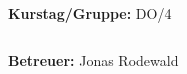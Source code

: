 \documentclass[12pt,a4paper]{article}
\begin{document}
\begin{verbatim}


\end{verbatim}
			\begin{flushleft}
			\textbf{\Large{Kurstag/Gruppe:}} \Large{DO/4}
			\end{flushleft}

\begin{verbatim}

\end{verbatim}
			\begin{flushleft}
			\LARGE{\textbf{Betreuer:}}	\Large{Jonas Rodewald}	
			\end{flushleft}

\pagebreak
\setlength{\columnsep}{20pt}
\end{document}

